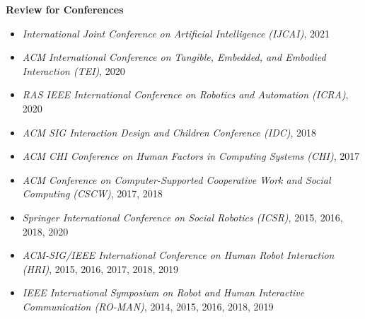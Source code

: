 \textbf{Review for Conferences}
\begin{itemize}
    \item \emph{International Joint Conference on Artificial Intelligence (IJCAI)}, 2021
    \item \emph{ACM International Conference on Tangible, Embedded, and Embodied Interaction (TEI)}, 2020
    \item \emph{RAS IEEE International Conference on Robotics and Automation (ICRA)}, 2020
    \item \emph{ACM SIG Interaction Design and Children Conference (IDC)}, 2018
    \item \emph{ACM CHI Conference on Human Factors in Computing Systems (CHI)}, 2017
    \item \emph{ACM Conference on Computer-Supported Cooperative Work and Social Computing (CSCW)}, 2017, 2018
    \item \emph{Springer International Conference on Social Robotics (ICSR)}, 2015, 2016, 2018, 2020
    \item \emph{ACM-SIG/IEEE International Conference on Human Robot Interaction (HRI)}, 2015, 2016, 2017, 2018, 2019
    \item \emph{IEEE International Symposium on Robot and Human Interactive Communication (RO-MAN)}, 2014, 2015, 2016, 2018, 2019
\end{itemize}

